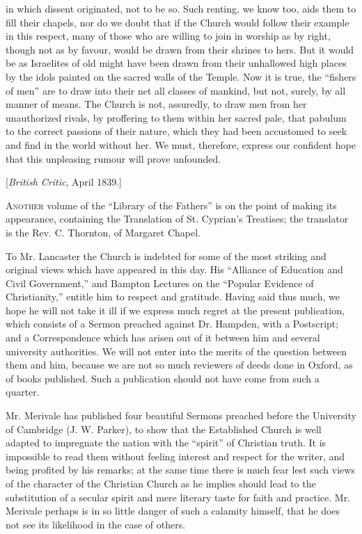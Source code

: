 in which dissent originated, not to be so. Such renting, we know too,
aids them to fill their chapels, nor do we doubt that if the Church
would follow their example in this respect, many of those who are
willing to join in worship as by right, though not as by favour, would
be drawn from their shrines to hers. But it would be as Israelites of
old might have been drawn from their unhallowed high places by the idols
painted on the sacred walls of the Temple. Now it is true, the ``fishers
of men'' are to draw into their net all classes of mankind, but not,
surely, by all manner of means. The Church is not, assuredly, to draw
men from her unauthorized rivals, by proffering to them within her
sacred pale, that pabulum to the correct passions of their nature, which
they had been accustomed to seek and find in the world without her. We
must, therefore, express our confident hope that this unpleasing rumour
will prove unfounded.


[\emph{British Critic}, April 1839.]

A\textsc{nother} volume of the ``Library
of the Fathers'' is on the point of making its appearance, containing the
Translation of St. Cyprian's Treatises; the translator is the Rev. C.
Thornton, of Margaret Chapel.

To Mr. Lancaster the Church is indebted for some of
the most striking and original views which have appeared in this day.
His ``Alliance of Education and Civil Government,'' and Bampton Lectures
on the ``Popular Evidence of Christianity,'' entitle him to respect and
gratitude. Having said thus much, we hope he will not take it ill if we
express much regret at the present publication, which consists of a
Sermon preached against Dr. Hampden, with a Postscript; and a
Correspondence which has arisen out of it between him and several
university authorities. We will not enter into the merits of the
question between them and him, because we are not so much reviewers of
deeds done in Oxford, as of books published. Such a publication should
not have come from such a quarter.

Mr. Merivale has published four beautiful Sermons
preached before the University of Cambridge (J. W. Parker), to show that
the Established Church is well adapted to impregnate the nation with the
``spirit'' of Christian truth. It is impossible to read them without
feeling interest and respect for the writer, and being profited by his
remarks; at the same time there is much fear lest such views of the
character of the Christian Church as he implies should lead to the
substitution of a secular spirit and mere literary taste for faith and
practice. Mr. Merivale perhaps is in so little danger of such a calamity
himself, that he does not see its likelihood in the case of others.

